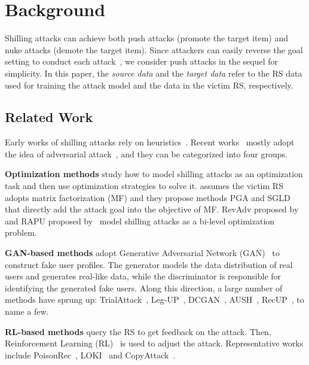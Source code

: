 

\section{Background}
\label{sec:pre}

Shilling attacks can achieve both push attacks (promote the target item) and nuke attacks (demote the target item).
Since attackers can easily reverse the goal setting to conduct each attack~\citep{abs-2206-11433}, we consider push attacks in the sequel for simplicity.
In this paper, the \emph{source data} and the \emph{target data} refer to the RS data used for training the attack model and the data in the victim RS, respectively.


\subsection{Related Work}
\label{sec:related}

Early works of shilling attacks rely on heuristics~\citep{GunesKBP14}. 
Recent works~\cite{DeldjooNM21} mostly adopt the idea of adversarial attack~\citep{YuanHZL19}, and they can be categorized into four groups.


\textbf{Optimization methods} study how to model shilling attacks as an optimization task and then use optimization strategies to solve it.
\citet{LiWSV16} assumes the victim RS adopts matrix factorization (MF) and they propose methods PGA and SGLD that directly add the attack goal into the objective of MF.
RevAdv proposed by~\citet{TangWW20} and RAPU proposed by~\citet{ZhangTLSYZG21} model shilling attacks as a bi-level optimization problem.

\textbf{GAN-based methods} adopt Generative Adversarial Network (GAN)~\citep{GoodfellowPMXWOCB14} to construct fake user profiles. The generator models the data distribution of real users and generates real-like data, while the discriminator is responsible for identifying the generated fake users. 
Along this direction, a large number of methods have sprung up: TrialAttack~\citep{WuLGZC21}, Leg-UP~\citep{abs-2206-11433}, DCGAN~\citep{Christakopoulou19}, AUSH~\citep{LinC0XLY20}, RecUP~\citep{ZhangCZWL21}, to name a few. 

\textbf{RL-based methods} query the RS to get feedback on the attack. Then, Reinforcement Learning (RL)~\citep{KaelblingLM96} is used to adjust the attack. Representative works include PoisonRec~\citep{SongLHWLLG20}, LOKI~\citep{ZhangLD020} and CopyAttack~\citep{FanDZ0LWT021}. 

